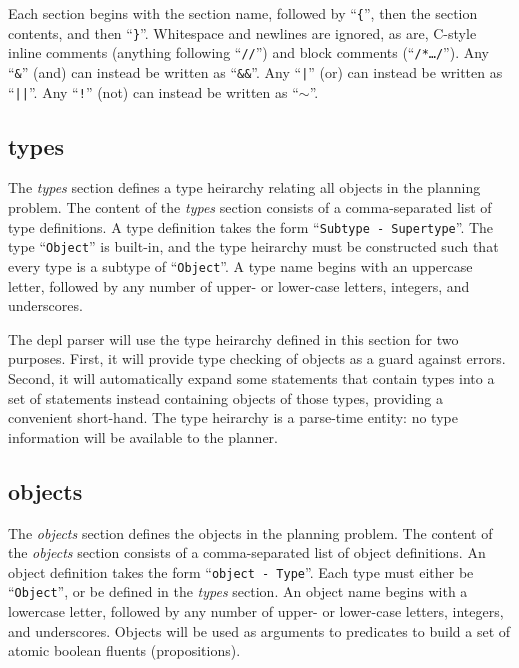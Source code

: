 \documentclass{article}
\begin{document}
\noindent
Each section begins with the section name, followed by
``\verb|{|'', 
then the section contents, and then
``\verb|}|''. 
Whitespace and newlines are ignored,
as are, C-style inline comments (anything
following ``\texttt{//}'') and block comments (``\texttt{/*\ldots*/}'').
Any
``\texttt{\&}''
(and) can instead be written as
``\texttt{\&\&}''.
Any
``\texttt{|}''
(or) can instead be written as
``\texttt{||}''.
Any
``\texttt{!}''
(not) can instead be written as
``$\sim$''.


\subsection{types}

The \emph{types} section defines a type heirarchy relating all objects in the planning
problem.
The content of the \emph{types} section consists of a comma-separated list of
type definitions. A type definition takes the form
``\texttt{Subtype - Supertype}''.
The type ``\texttt{Object}'' is built-in, and
the type heirarchy must be constructed such that every type is a subtype of
``\texttt{Object}''.  A type name begins with an uppercase letter, followed
by any number of upper- or lower-case letters, integers, and underscores.

The depl parser will use the type heirarchy defined in this section for two 
purposes. First, it will provide type checking of objects as a guard against errors.
Second, it will automatically expand some
statements that contain types into a set of statements instead containing
objects of those types, providing a convenient short-hand. 
The type heirarchy is a parse-time entity: no type information will be
available to the planner.


\subsection{objects}

The \emph{objects} section defines the objects in the planning problem.
The content of the \emph{objects} section consists of a comma-separated list of
object definitions. An object definition takes the form ``\texttt{object -
Type}''. Each type must
either be ``\texttt{Object}'', or be defined in the \emph{types} section.  An
object name begins with a lowercase letter, followed by any number of upper-
or lower-case letters, integers, and underscores.
Objects will be used as arguments to predicates to build a set of atomic
boolean fluents (propositions).
\end{document}

